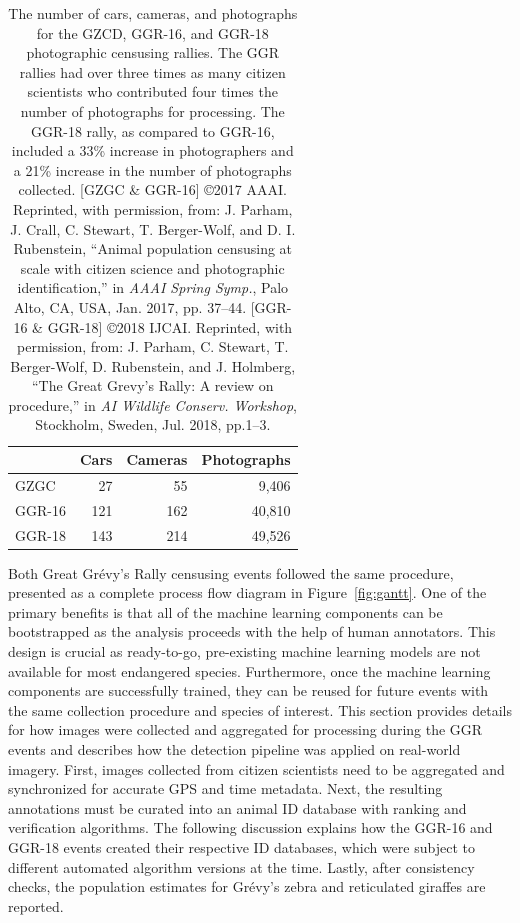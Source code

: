 \begin{table}[!t]
    \caption{The number of cars, cameras, and photographs for the GZCD, GGR-16, and GGR-18 photographic censusing rallies.  The GGR rallies had over three times as many citizen scientists who contributed four times the number of photographs for processing.  The GGR-18 rally, as compared to GGR-16, included a 33\% increase in photographers and a 21\% increase in the number of photographs collected. [GZGC \& GGR-16] \copyright 2017 AAAI. Reprinted, with permission, from: J. Parham, J. Crall, C. Stewart, T. Berger-Wolf, and D. I. Rubenstein, ``Animal population censusing at scale with citizen science and photographic identification,'' in \textit{AAAI Spring Symp.}, Palo Alto, CA, USA, Jan. 2017, pp. 37–44. [GGR-16 \& GGR-18] \copyright 2018 IJCAI. Reprinted, with permission, from: J. Parham, C. Stewart, T. Berger-Wolf, D. Rubenstein, and J. Holmberg, ``The Great Grevy’s Rally: A review on procedure,'' in \textit{AI Wildlife Conserv. Workshop}, Stockholm, Sweden, Jul. 2018, pp.1–3.}
    \label{table:collection}
    \begin{center}
        \begin{tabular}{| l | r | r | r |}
            \hline
                   & Cars & Cameras & Photographs \\
            \hline
            GZGC   & 27   & 55      & 9,406       \\
            \hline
            GGR-16 & 121  & 162     & 40,810      \\
            \hline
            GGR-18 & 143  & 214     & 49,526      \\
            \hline
        \end{tabular}
    \end{center}
\end{table}

Both Great Gr\'evy's Rally censusing events followed the same procedure, presented as a complete process flow diagram in Figure~\ref{fig:gantt}.  One of the primary benefits is that all of the machine learning components can be bootstrapped as the analysis proceeds with the help of human annotators.  This design is crucial as ready-to-go, pre-existing machine learning models are not available for most endangered species. Furthermore, once the machine learning components are successfully trained, they can be reused for future events with the same collection procedure and species of interest.  This section provides details for how images were collected and aggregated for processing during the GGR events and describes how the detection pipeline was applied on real-world imagery. First, images collected from citizen scientists need to be aggregated and synchronized for accurate GPS and time metadata.  Next, the resulting annotations must be curated into an animal ID database with ranking and verification algorithms.  The following discussion explains how the GGR-16 and GGR-18 events created their respective ID databases, which were subject to different automated algorithm versions at the time.  Lastly, after consistency checks, the population estimates for Gr\'evy's zebra and reticulated giraffes are reported.

